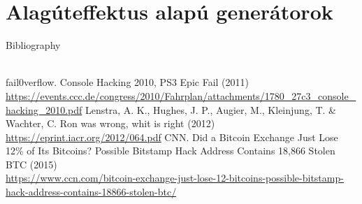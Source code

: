 \documentclass[12pt,a4paper,oneside]{article}
\begin{document}
\section*{Alagúteffektus alapú generátorok}

Bibliography
\\\\
\begin{thebibliography}{12}
	\sloppy
	 fail0verflow. Console Hacking 2010, PS3 Epic Fail (2011) \\ \url{https://events.ccc.de/congress/2010/Fahrplan/attachments/1780_27c3_console_hacking_2010.pdf}
	 Lenstra, A. K., Hughes, J. P., Augier, M., Kleinjung, T. \& Wachter, C. Ron was wrong, whit is right (2012) \\ \url{https://eprint.iacr.org/2012/064.pdf}
	 CNN. Did a Bitcoin Exchange Just Lose 12\% of Its Bitcoins? Possible Bitstamp Hack Address Contains 18,866 Stolen BTC (2015) \\ \url{https://www.ccn.com/bitcoin-exchange-just-lose-12-bitcoins-possible-bitstamp-hack-address-contains-18866-stolen-btc/}
\end{thebibliography}
\end{document}
